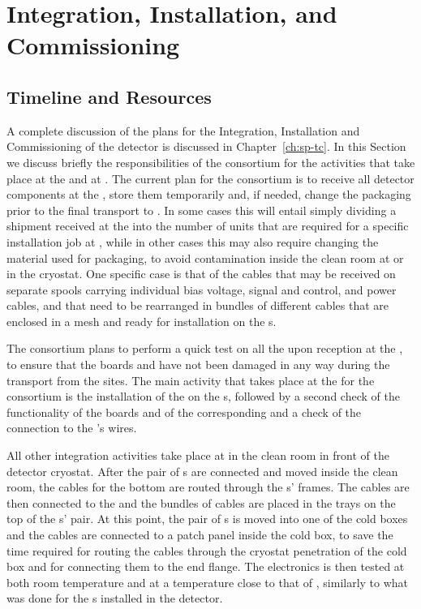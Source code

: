 \section{Integration, Installation, and Commissioning}
\label{sec:fdsp-tpcelec-integration}

\subsection{Timeline and Resources}
\label{sec:fdsp-tpcelec-integration-timeline}

A complete discussion of the plans for the Integration, Installation
and Commissioning of the detector is discussed in Chapter~\ref{ch:sp-tc}.
In this Section we discuss briefly the responsibilities of the 
consortium for the activities that take place at the
 and at \surf. The current plan for the 
consortium is to receive all detector components at the ,
store them temporarily and, if needed, change the packaging prior to
the final transport to \surf. In some cases this will entail simply
dividing a shipment received at the  into the number of
units that are required for a specific installation job at \surf,
while in other cases this may also require changing the material
used for packaging, to avoid contamination inside the clean room
at \surf or in the cryostat. One specific case is that of the 
cables that may be received on separate spools carrying 
individual bias voltage, signal and control, and power cables, and that 
need to be rearranged in bundles of different cables that are enclosed
in a mesh and ready for installation on the s. 

The  consortium plans to perform a quick test on all
the  upon reception at the , to ensure that
the boards and  have not been damaged in any way during the transport 
from the   sites. The main activity that takes 
place at the  for the  consortium is the 
installation of the  on the s, followed by 
a second check of the functionality of the boards and of the 
corresponding  and a check of the connection to the 
's wires. 

All other integration activities take place at \surf in the clean room
in front of the detector cryostat. After the pair of s are 
connected and moved inside the clean room, the  cables
for the bottom  are routed through the s' frames.
The cables are then connected to the  and the bundles
of cables are placed in the trays on the top of the s' pair.
At this point, the pair of s is moved into one of the cold
boxes and the cables are connected to a patch panel inside the cold box,
to save the time required for routing the cables through the cryostat
penetration of the cold box and for connecting them to the end flange.
The  electronics is then tested at both room temperature
and at a temperature close to that of \lntwo, similarly to
what was done for the s installed in the  detector.

